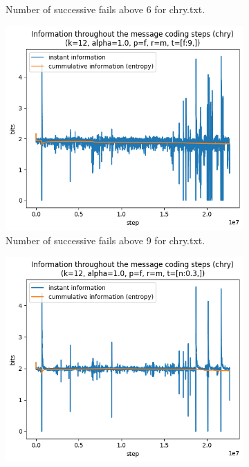 \documentclass{article}
\begin{document}
\begin{figure}
\begin{subfigure}[b]{0.3\textwidth}
\begin{center}
        \end{center}
        \caption{Number of successive fails above 6 for chry.txt.}
        \label{fig:results-threshold-f-6}
    \end{subfigure}
    \hfill
    \begin{subfigure}[b]{0.3\textwidth}
        \begin{center}
            \includegraphics[width=1.0\linewidth]{../scripts/images/chry_12_1.0_f_m_[f:9,].png}
        \end{center}
        \caption{Number of successive fails above 9 for chry.txt.}
        \label{fig:results-threshold-f-9}
    \end{subfigure}
    \begin{subfigure}[b]{0.3\textwidth}
        \begin{center}
            \includegraphics[width=1.0\linewidth]{../scripts/images/chry_12_1.0_f_m_[n:0.3,].png}

\end{center}
\end{subfigure}
\end{figure}
\end{document}
